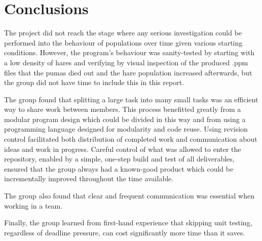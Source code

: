 \section{Conclusions}
\label{Conclusions}

The project did not reach the stage where any serious investigation could be performed into the behaviour of populations over time given various starting conditions.  
However, the program's behaviour was sanity-tested by starting with a low density of hares and verifying by visual inspection of the produced .ppm files that the pumas died out and the hare population increased afterwards, but the group did not have time to include this in this report.

The group found that splitting a large task into many small tasks was an efficient way to share work between members.  
This process benefitted greatly from a modular program design which could be divided in this way and from using a programming language designed for modularity and code reuse.  
Using revision control facilitated both distribution of completed work and communication about ideas and work in progress. 
Careful control of what was allowed to enter the repository, enabled by a simple, one-step build and test of all deliverables, ensured that the group always had a known-good product which could be incrementally improved throughout the time available.

The group also found that clear and frequent communication was essential when working in a team. 

Finally, the group learned from first-hand experience that skipping unit testing, regardless of deadline pressure, can cost significantly more time than it saves.

